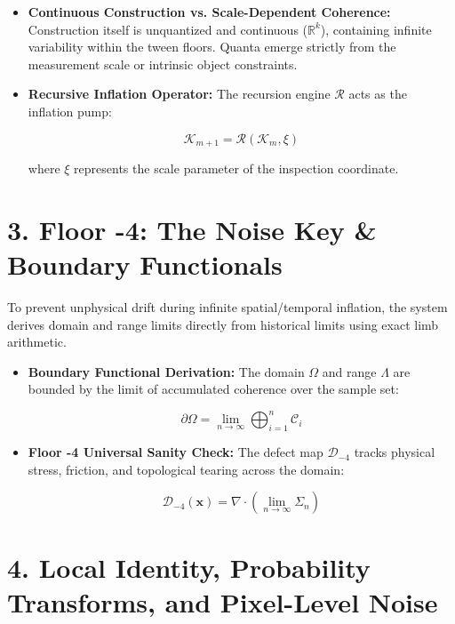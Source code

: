 \begin{itemize}
\item \textbf{Continuous Construction vs. Scale-Dependent Coherence:} Construction itself is unquantized and continuous (\(\mathbb{R}^k\)), containing infinite variability within the tween floors. Quanta emerge strictly from the measurement scale or intrinsic object constraints.
\item \textbf{Recursive Inflation Operator:} The recursion engine \(\mathcal{R}\) acts as the inflation pump:

\[
\mathcal{K}_{m+1} = \mathcal{R}(\mathcal{K}_m, \xi)
\]

where \(\xi\) represents the scale parameter of the inspection coordinate.
\end{itemize}

\medskip

\section{\texorpdfstring{3. Floor -4: The Noise Key \& Boundary Functionals}{3. Floor -4: The Noise Key \& Boundary Functionals}}

To prevent unphysical drift during infinite spatial/temporal inflation, the system derives domain and range limits directly from historical limits using exact limb arithmetic.

\begin{itemize}
\item \textbf{Boundary Functional Derivation:} The domain \(\Omega\) and range \(\Lambda\) are bounded by the limit of accumulated coherence over the sample set:

\[
\partial \Omega = \lim_{n \to \infty} \bigoplus_{i=1}^n \mathcal{C}_i
\]
\item \textbf{Floor -4 Universal Sanity Check:} The defect map \(\mathcal{D}_{-4}\) tracks physical stress, friction, and topological tearing across the domain:

\[
\mathcal{D}_{-4}(\mathbf{x}) = \nabla \cdot \left( \lim_{n \to \infty} \Sigma_n \right)
\]
\end{itemize}

\medskip

\section{\texorpdfstring{4. Local Identity, Probability Transforms, and Pixel-Level Noise}{4. Local Identity, Probability Transforms, and Pixel-Level Noise}}

